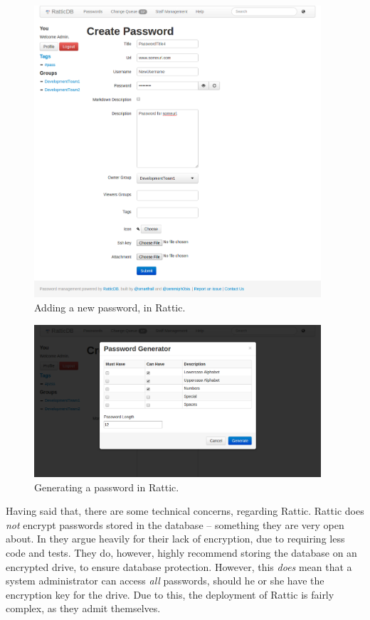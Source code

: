 			\begin{figure}[h!]
				\centering
				\includegraphics[width=0.95\textwidth]{figures/analysis/rattic_newpassword_main.png}
				\caption{Adding a new password, in Rattic.}
				\label{fig:rattic_newpassword_main}
			\end{figure}

			\begin{figure}[h!]
				\centering
				\includegraphics[width=0.95\textwidth]{figures/analysis/rattic_newpassword_passwordgen.png}
				\caption{Generating a password in Rattic.}
				\label{fig:rattic_newpassword_passwordgen}
			\end{figure}

			Having said that, there are some technical concerns, regarding Rattic. Rattic does \emph{not} encrypt passwords stored in the database -- something they are very open about. In \cite{rattic_encryption} they argue heavily for their lack of encryption, due to requiring less code and tests. They do, however, highly recommend storing the database on an encrypted drive, to ensure database protection. However, this \emph{does} mean that a system administrator can access \emph{all} passwords, should he or she have the encryption key for the drive. Due to this, the deployment of Rattic is fairly complex, as they admit themselves. 

